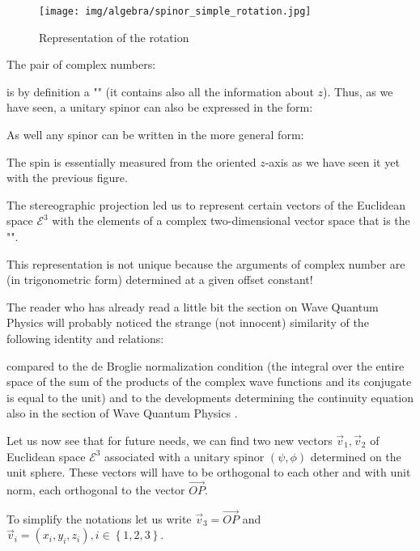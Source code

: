 	\begin{figure}[H]
		\centering
		\texttt{[image: img/algebra/spinor\_simple\_rotation.jpg]}
		\caption[]{Representation of the rotation}
	\end{figure}

	The pair of complex numbers:

	

	is by definition a "" (it contains also all the information about $z$). Thus, as we have seen, a unitary spinor can also be expressed in the form:
	
	As well any spinor can be written in the more general form:
	
	The spin is essentially measured from the oriented $z$-axis as we have seen it yet with the previous figure.
	
	The stereographic projection led us to represent certain vectors of the Euclidean space $\mathcal{E}^3$ with the elements of a complex two-dimensional vector space that is the "".
	
	\begin{tcolorbox}[title=Remark,colframe=black,arc=10pt]
This representation is not unique because the arguments of complex number are (in trigonometric form) determined at a given offset constant!
	\end{tcolorbox}	
	
	The reader who has already read a little bit the section on Wave Quantum Physics  will probably noticed the strange (not innocent) similarity of the following identity and relations:
	
	compared to the de Broglie normalization condition (the integral over the entire space of the sum of the products of the complex wave functions and its conjugate is equal to the unit) and to the developments determining the continuity equation also in the section of Wave Quantum Physics .
	
	Let us now see that for future needs, we can find two new vectors $\vec{v}_1,\vec{v}_2$ of Euclidean space $\mathcal{E}^3$ associated with a unitary spinor $(\psi,\phi) $ determined on the unit sphere. These vectors will have to be orthogonal to each other and with unit norm, each orthogonal to the vector $\overrightarrow{OP}$.	
	
	To simplify the notations let us write  $\vec{v}_3=\overrightarrow{OP}$ and $\vec{v}_i=(x_i,y_i,z_i),i\in \left\lbrace 1, 2 ,3\right\rbrace$.
	
